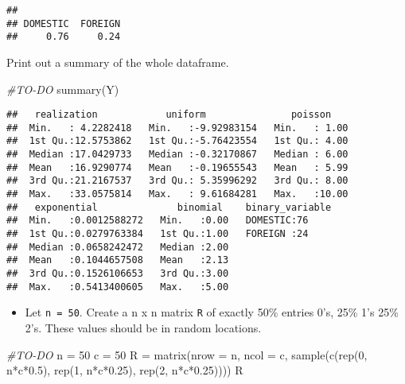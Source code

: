 \documentclass[
]{article}
\newenvironment{Shaded}{\begin{snugshade}}{\end{snugshade}}
\newcommand{\AttributeTok}[1]{\textcolor[rgb]{0.77,0.63,0.00}{#1}}
\newcommand{\CommentTok}[1]{\textcolor[rgb]{0.56,0.35,0.01}{\textit{#1}}}
\newcommand{\DecValTok}[1]{\textcolor[rgb]{0.00,0.00,0.81}{#1}}
\newcommand{\FloatTok}[1]{\textcolor[rgb]{0.00,0.00,0.81}{#1}}
\newcommand{\FunctionTok}[1]{\textcolor[rgb]{0.00,0.00,0.00}{#1}}
\newcommand{\NormalTok}[1]{#1}
\newcommand{\OtherTok}[1]{\textcolor[rgb]{0.56,0.35,0.01}{#1}}
\newcommand{\SpecialCharTok}[1]{\textcolor[rgb]{0.00,0.00,0.00}{#1}}
\providecommand{\tightlist}{%
  \setlength{\itemsep}{0pt}\setlength{\parskip}{0pt}}
\begin{document}
\begin{verbatim}
## 
## DOMESTIC  FOREIGN 
##     0.76     0.24
\end{verbatim}

Print out a summary of the whole dataframe.

\begin{Shaded}
\begin{Highlighting}[]
\CommentTok{\#TO{-}DO}
\FunctionTok{summary}\NormalTok{(Y)}
\end{Highlighting}
\end{Shaded}

\begin{verbatim}
##   realization            uniform               poisson     
##  Min.   : 4.2282418   Min.   :-9.92983154   Min.   : 1.00  
##  1st Qu.:12.5753862   1st Qu.:-5.76423554   1st Qu.: 4.00  
##  Median :17.0429733   Median :-0.32170867   Median : 6.00  
##  Mean   :16.9290774   Mean   :-0.19655543   Mean   : 5.99  
##  3rd Qu.:21.2167537   3rd Qu.: 5.35996292   3rd Qu.: 8.00  
##  Max.   :33.0575814   Max.   : 9.61684281   Max.   :10.00  
##   exponential              binomial    binary_variable
##  Min.   :0.0012588272   Min.   :0.00   DOMESTIC:76    
##  1st Qu.:0.0279763384   1st Qu.:1.00   FOREIGN :24    
##  Median :0.0658242472   Median :2.00                  
##  Mean   :0.1044657508   Mean   :2.13                  
##  3rd Qu.:0.1526106653   3rd Qu.:3.00                  
##  Max.   :0.5413400605   Max.   :5.00
\end{verbatim}

\begin{itemize}
\tightlist
\item
  Let \texttt{n\ =\ 50}. Create a n x n matrix \texttt{R} of exactly
  50\% entries 0's, 25\% 1's 25\% 2's. These values should be in random
  locations.
\end{itemize}

\begin{Shaded}
\begin{Highlighting}[]
\CommentTok{\#TO{-}DO}
\NormalTok{n }\OtherTok{=} \DecValTok{50}
\NormalTok{c }\OtherTok{=} \DecValTok{50}
\NormalTok{R }\OtherTok{=} \FunctionTok{matrix}\NormalTok{(}\AttributeTok{nrow =}\NormalTok{ n, }\AttributeTok{ncol =}\NormalTok{ c, }\FunctionTok{sample}\NormalTok{(}\FunctionTok{c}\NormalTok{(}\FunctionTok{rep}\NormalTok{(}\DecValTok{0}\NormalTok{, n}\SpecialCharTok{*}\NormalTok{c}\SpecialCharTok{*}\FloatTok{0.5}\NormalTok{), }\FunctionTok{rep}\NormalTok{(}\DecValTok{1}\NormalTok{, n}\SpecialCharTok{*}\NormalTok{c}\SpecialCharTok{*}\FloatTok{0.25}\NormalTok{), }\FunctionTok{rep}\NormalTok{(}\DecValTok{2}\NormalTok{, n}\SpecialCharTok{*}\NormalTok{c}\SpecialCharTok{*}\FloatTok{0.25}\NormalTok{))))}
\NormalTok{R}
\end{Highlighting}
\end{Shaded}
\end{document}
